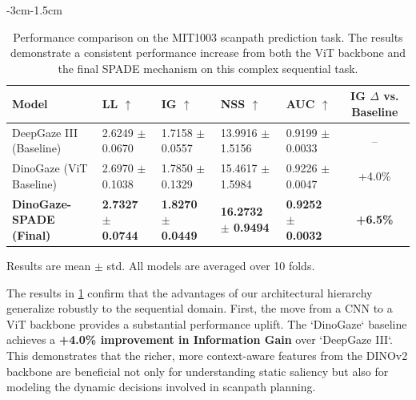 \begin{table}[h!]
\begin{adjustwidth}{-3cm}{-1.5cm} 
\centering
{ %
\small %
\setlength{\tabcolsep}{4pt} %

\caption{
    Performance comparison on the MIT1003 scanpath prediction task. 
    The results demonstrate a consistent performance increase from both the ViT backbone and the final SPADE mechanism on this complex sequential task.
}
\label{tab:results_scanpath}
\begin{tabular}{@{}l l l l l c@{}}
    \toprule
    \textbf{Model} & \textbf{LL} $\uparrow$ & \textbf{IG} $\uparrow$ & \textbf{NSS} $\uparrow$ & \textbf{AUC} $\uparrow$ & \textbf{IG $\Delta$ vs. Baseline} \\
    \midrule
    
    DeepGaze III (Baseline) & 2.6249 $\pm$ 0.0670 & 1.7158 $\pm$ 0.0557 & 13.9916 $\pm$ 1.5156 & 0.9199 $\pm$ 0.0033 & -- \\
    DinoGaze (ViT Baseline)  & 2.6970 $\pm$ 0.1038 & 1.7850 $\pm$ 0.1329 & 15.4617 $\pm$ 1.5984 & 0.9226 $\pm$ 0.0047 & +4.0\% \\
    \bfseries DinoGaze-SPADE (Final)   & \bfseries \bfseries 2.7327 $\pm$ 0.0744 & \bfseries \bfseries 1.8270 $\pm$ 0.0449 & \bfseries \bfseries 16.2732 $\pm$ 0.9494 & \bfseries \bfseries 0.9252 $\pm$ 0.0032 & \bfseries +6.5\% \\
    \bottomrule
\end{tabular}
\par\medskip
\footnotesize{
    Results are mean $\pm$ std. All models are averaged over 10 folds.
}
} %
\end{adjustwidth}
\end{table}

The results in \cref{tab:results_scanpath} confirm that the advantages of our architectural hierarchy generalize robustly to the sequential domain. First, the move from a CNN to a ViT backbone provides a substantial performance uplift. The `DinoGaze` baseline achieves a \textbf{+4.0\% improvement in Information Gain} over `DeepGaze III`. This demonstrates that the richer, more context-aware features from the DINOv2 backbone are beneficial not only for understanding static saliency but also for modeling the dynamic decisions involved in scanpath planning.

